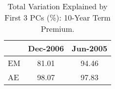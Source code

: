 \begin{tiny}\begin{table}\centering\begin{tabular}{l|cc}\toprule & Dec-2006 & Jun-2005 \\\midrule EM & 81.01 & 94.46 \\AE & 98.07 & 97.83 \\\bottomrule\end{tabular}\caption{Total Variation Explained by First 3 PCs (\%): 10-Year Term Premium.}\label{tab:temp_tp_common}\end{table}\end{tiny}